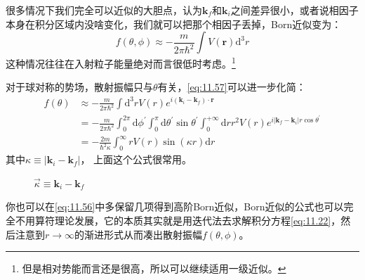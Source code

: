 \documentclass[a4paper,zihao=-4,linespread=1]{ctexrep}
\begin{document}
	很多情况下我们完全可以近似的大胆点，认为$\mathbf{k}_f$和$\mathbf{k}_i$之间差异很小，或者说相因子本身在积分区域内没啥变化，我们就可以把那个相因子丢掉，Born近似变为：
	\begin{equation}
		\label{eq:11.58}
		\boxed{
			f(\theta,\phi)\approx -\frac{m}{2\pi\hbar^2}\int V(\mathbf{r})\mathrm{d}^3r}
	\end{equation}
	这种情况往往在入射粒子能量绝对而言很低时考虑。\footnote{但是相对势能而言还是很高，所以可以继续适用一级近似。}
	
	对于球对称的势场，散射振幅只与$\theta$有关，\ref{eq:11.57}可以进一步化简：
	\begin{equation}
		\begin{aligned}
			\label{eq:11.59}
				f(\theta)&\approx -\frac{m}{2\pi\hbar^2}\int\mathrm{d}^3r V({r})e^{i\left(\mathbf{k}_i-\mathbf{k}_f\right)\cdot \mathbf{r}}\\
				&=-\frac{m}{2\pi\hbar^2}\int_0^{2\pi}\mathrm{d}\phi^\prime\int_0^{\pi}\mathrm{d}\theta^\prime\sin\theta^\prime\int_0^{+\infty}\mathrm{d}r r^2 V(r)e^{i\left|\mathbf{k}_f-\mathbf{k}_i\right|r\cos\theta^\prime}\\
				&=\boxed{
				-\frac{2 m}{\hbar^{2} \kappa} \int_{0}^{\infty} r V(r) \sin (\kappa r) \mathrm{d}r
			}
		\end{aligned}
	\end{equation}
	其中$\kappa\equiv\left|\mathbf{k}_i-\mathbf{k}_f\right|$， 上面这个公式很常用。
	\begin{figure}[h]
		\centering
		\label{fig:11.5}
		\caption{$\vec{\kappa}\equiv \mathbf{k}_i-\mathbf{k}_f$}
	\end{figure}	

	你也可以在\ref{eq:11.56}中多保留几项得到高阶Born近似，Born近似的公式也可以完全不用算符理论发展，它的本质其实就是用迭代法去求解积分方程\ref{eq:11.22}，然后注意到$r\to\infty$的渐进形式从而凑出散射振幅$f(\theta,\phi)$。
	
\end{document}
